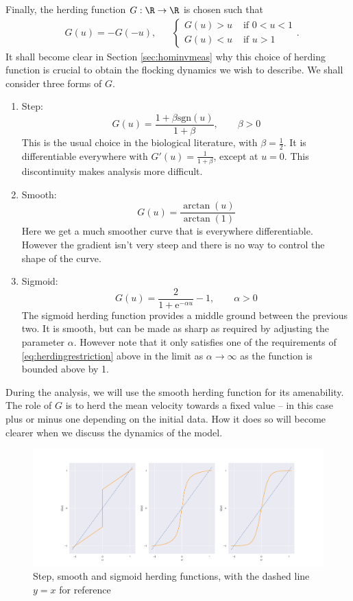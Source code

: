  Finally, the herding function $G:\R \to \R$ is chosen such that
 \begin{align}\label{eq:herdingrestriction}
 &G(u)=-G(-u),&& {\begin{cases}
     G(u)>u & \text{ if } 0< u <1\\
     G(u)<u & \text{ if } u > 1
     \end{cases}}.
 \end{align}
It shall become clear in Section \ref{sec:hominvmeas} why this choice of herding function is crucial to obtain the flocking dynamics we wish to describe. We shall consider three forms of $G$.
 \begin{enumerate}
     \item Step:
     \[
     G(u) = \frac{1+\beta \mathrm{sgn}(u)}{1+\beta}, \qquad \beta > 0	
     \]
     This is the usual choice in the biological literature, with \(\beta = \frac{1}{2}\). It is differentiable everywhere with $G'(u) = \frac{1}{1+\beta}$, except at $u=0$. This discontinuity makes analysis more difficult.
     \item Smooth:
     \[
     G(u) = \frac{\arctan(u)}{\arctan(1)}
     \]
     Here we get a much smoother curve that is everywhere differentiable. However the gradient isn't very steep and there is no way to control the shape of the curve.
     \item Sigmoid:
     \[
     G(u) = \frac{2}{1+\mathrm{e}^{-\alpha u}} - 1 , \qquad \alpha >0
     \]
The sigmoid herding function provides a middle ground between the previous two. It is smooth, but can be made as sharp as required by adjusting the parameter $\alpha$. However note that it only satisfies one of the requirements of \ref{eq:herdingrestriction} above in the limit as $\alpha \to \infty$ as the function is bounded above by 1.
\end{enumerate}
 During the analysis, we will use the smooth herding function for its amenability. The role of $G$ is to herd the mean velocity towards a fixed value -- in this case plus or minus one depending on the initial data. How it does so will become clearer when we discuss the dynamics of the model.
 \begin{figure}
     \centering
     \includegraphics[width=\linewidth]{Figures/herdingfunctions}
     \caption{Step, smooth and sigmoid herding functions, with the dashed line $y=x$ for reference}
     \label{fig:herdingfunctions}
 \end{figure}


